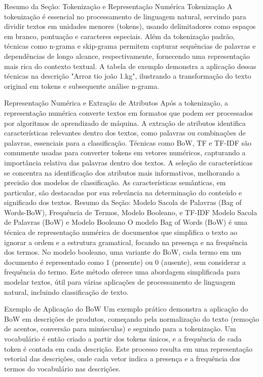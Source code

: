 {Resumo da Seção: Tokenização e Representação Numérica
Tokenização
A tokenização é essencial no processamento de linguagem natural, servindo para dividir textos em unidades menores (tokens), usando delimitadores como espaços em branco, pontuação e caracteres especiais. Além da tokenização padrão, técnicas como n-grama e skip-grama permitem capturar sequências de palavras e dependências de longo alcance, respectivamente, fornecendo uma representação mais rica do contexto textual. A tabela de exemplo demonstra a aplicação dessas técnicas na descrição "Arroz tio joão 1.kg", ilustrando a transformação do texto original em tokens e subsequente análise n-grama.

Representação Numérica e Extração de Atributos
Após a tokenização, a representação numérica converte textos em formatos que podem ser processados por algoritmos de aprendizado de máquina. A extração de atributos identifica características relevantes dentro dos textos, como palavras ou combinações de palavras, essenciais para a classificação. Técnicas como BoW, TF e TF-IDF são comumente usadas para converter tokens em vetores numéricos, capturando a importância relativa das palavras dentro dos textos. A seleção de características se concentra na identificação dos atributos mais informativos, melhorando a precisão dos modelos de classificação. As características semânticas, em particular, são destacadas por sua relevância na determinação do conteúdo e significado dos textos.
Resumo da Seção: Modelo Sacola de Palavras (Bag of Words-BoW), Frequência de Termos, Modelo Booleano, e TF-IDF
Modelo Sacola de Palavras (BoW) e Modelo Booleano
O modelo Bag of Words (BoW) é uma técnica de representação numérica de documentos que simplifica o texto ao ignorar a ordem e a estrutura gramatical, focando na presença e na frequência dos termos. No modelo booleano, uma variante do BoW, cada termo em um documento é representado como 1 (presente) ou 0 (ausente), sem considerar a frequência do termo. Este método oferece uma abordagem simplificada para modelar textos, útil para várias aplicações de processamento de linguagem natural, incluindo classificação de texto.

Exemplo de Aplicação do BoW
Um exemplo prático demonstra a aplicação do BoW em descrições de produtos, começando pela normalização do texto (remoção de acentos, conversão para minúsculas) e seguindo para a tokenização. Um vocabulário é então criado a partir dos tokens únicos, e a frequência de cada token é contada em cada descrição. Este processo resulta em uma representação vetorial das descrições, onde cada vetor indica a presença e a frequência dos termos do vocabulário nas descrições.

}
